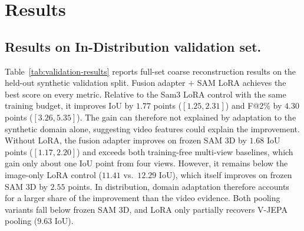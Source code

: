 \documentclass{article}
\begin{document}
\section{Results}
\subsection{Results on In-Distribution validation set.}

Table~\ref{tab:validation-results} reports full-set coarse reconstruction results on the held-out synthetic validation split. Fusion adapter + SAM LoRA achieves the best score on every metric. Relative to the Sam3 LoRA control with the same training budget, it improves IoU by $1.77$ points ($[1.25, 2.31]$) and F@2\% by $4.30$ points ($[3.26, 5.35]$). The gain can therefore not explained by adaptation to the synthetic domain alone, suggesting video features could explain the improvement. Without LoRA, the fusion adapter improves on frozen SAM 3D by $1.68$ IoU points ($[1.17, 2.20]$) and exceeds both training-free multi-view baselines, which gain only about one IoU point from four views. However, it remains below the image-only LoRA control ($11.41$ vs.\ $12.29$ IoU), which itself improves on frozen SAM 3D by $2.55$ points. In distribution, domain adaptation therefore accounts for a larger share of the improvement than the video evidence. Both pooling variants fall below frozen SAM 3D, and LoRA only partially recovers V-JEPA pooling ($9.63$ IoU).
\end{document}
